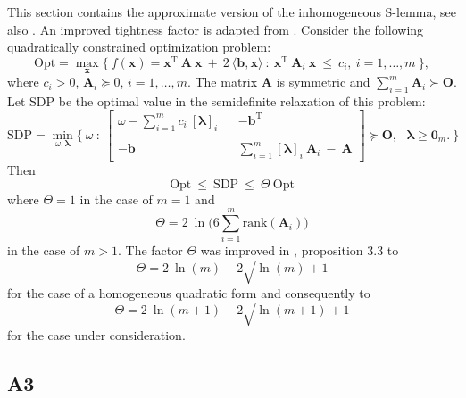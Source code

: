 \documentclass[letterpaper,11pt]{article}
\newcommand{\AR}[2]{\left[\begin{array}{#1}#2\end{array}\right]}
\newcommand{\rank}{\mathrm{rank}}
\newcommand{\T}{\mathrm{T}}
\begin{document}
This section contains the approximate version of the inhomogeneous 
S-lemma, see also \cite{bental6}.   An improved tightness factor 
is adapted from \cite{jud_17}.
Consider the following quadratically constrained optimization problem:
$$
\text{Opt} = \max_{\mathbf{x}} \{ ~ f(\mathbf{x}) = \mathbf{x}^\T ~ \mathbf{A} ~\mathbf{x} ~+~ 2 ~ \langle \mathbf{b}, \mathbf{x} \rangle~:~  \mathbf{x}^\T ~ \mathbf{A}_i ~\mathbf{x} ~ \leq ~ c_i, ~ i = 1, \hdots, m ~ \},
$$
where $c_i > 0$, $\mathbf{A}_i \succeq 0 $, $i = 1, \hdots, m$. The matrix $\mathbf{A}$ is symmetric and $ \sum_{i=1}^m \mathbf{A}_i \succ \mathbf{O}$.
Let SDP be the optimal value in the semidefinite relaxation of this problem:
$$
\text{SDP} = \min_{\omega, \bm{\lambda}} \{ ~ \omega ~:~ 
\AR{ccc}{\omega - \sum_{i=1}^m c_i ~ [\bm{\lambda}]_i &  & - \mathbf{b}^\T \\ &  &  \\ 
	- \mathbf{b} &  & \sum_{i=1}^m  [\bm{\lambda}]_i ~ \mathbf{A}_i ~ - ~ \mathbf{A}} \succeq \mathbf{O}, ~~~\bm{\lambda} \geq \mathbf{0}_m. ~\}
$$
Then 
\begin{equation}
\label{sandwich}
\text{Opt} ~ \leq ~ \text{SDP} ~\leq ~ \Theta ~ \text{Opt}
\end{equation}
where $ \Theta = 1 $ in the case of $m= 1$ and 
\begin{equation}
\label{factor}
\Theta = 2~  \ln \bigg(6 \sum_{i=1}^m \rank(\mathbf{A}_i) \bigg)
\end{equation}
in the case of $m > 1$. 
The factor $\Theta $ was improved in \cite{jud_17}, proposition 3.3
to 
$$
\Theta = 2~  \ln(m) +  2 \sqrt{\ln(m) } +1
$$
for the case of a homogeneous quadratic form and consequently to 
\begin{equation}
\label{factor_improved}
\Theta = 2~  \ln(m+1) +  2 \sqrt{\ln(m+1) } +1
\end{equation}
for the case under consideration.





\subsection*{A3}
\end{document}
